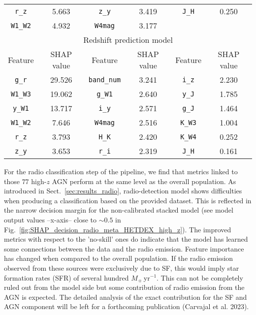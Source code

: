 \documentclass{aa}
\begin{document}
\begin{table}
{\begin{tabular}{c c c c c c}
\texttt{r\_z}       &  5.663        & \texttt{z\_y}         & 3.419         & \texttt{J\_H}         & 0.250      \\
\texttt{W1\_W2}     &  4.932        & \texttt{W4mag}        & 3.177         &                       &            \\[0.5em]
\hline\hline
\multicolumn{6}{c}{Redshift prediction model} \\
Feature             & SHAP value    & Feature               & SHAP value    & Feature               & SHAP value \\
\hline
\texttt{g\_r}       & 29.526        & \texttt{band\_num}    & 3.241         & \texttt{i\_z}         & 2.230    \\
\texttt{W1\_W3}     & 19.062        & \texttt{g\_W1}        & 2.640         & \texttt{y\_J}         & 1.785    \\
\texttt{y\_W1}      & 13.717        & \texttt{i\_y}         & 2.571         & \texttt{g\_J}         & 1.464    \\
\texttt{W1\_W2}     &  7.646        & \texttt{W4mag}        & 2.516         & \texttt{K\_W3}        & 1.004    \\
\texttt{r\_z}       &  3.793        & \texttt{H\_K}         & 2.420         & \texttt{K\_W4}        & 0.252    \\
\texttt{z\_y}       &  3.653        & \texttt{r\_i}         & 2.319         & \texttt{J\_H}         & 0.161    \\
\hline
\end{tabular}
}
\end{table}


For the radio classification step of the pipeline, we find that metrics linked to those $77$ high-$z$ AGN perform at the same level as the overall population. As introduced in Sect.~\ref{sec:results_radio}, radio-detection model shows difficulties when producing a classification based on the provided dataset. This is reflected in the narrow decision margin for the non-calibrated stacked model (see model output values --x-axis-- close to $\sim0.5$ in Fig.~\ref{fig:SHAP_decision_radio_meta_HETDEX_high_z}). The improved metrics with respect to the 'no-skill' ones do indicate that the model has learned some connections between the data and the radio emission. Feature importance has changed when compared to the overall population. If the radio emission observed from these sources were exclusively due to SF, this would imply star formation rates (SFR) of several hundred $M_\sun$\,yr$^{-1}$. This can not be completely ruled out from the model side but some contribution of radio emission from the AGN is expected. The detailed analysis of the exact contribution for the SF and AGN component will be left for a forthcoming publication (Carvajal et al. 2023). 
\end{document}
